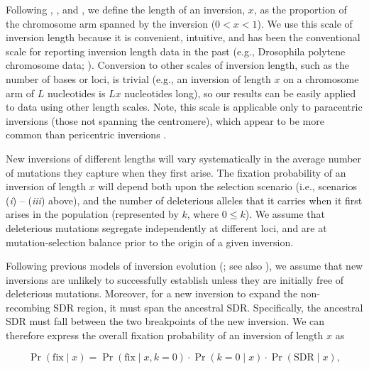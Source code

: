 \documentclass{article}
\begin{document}
Following \citet{vanValenLevins1968}, \citet{Santos1986}, and \citet{ConnallonOlito2020}, we define the length of an inversion, $x$, as the proportion of the chromosome arm spanned by the inversion ($0 < x < 1$). 
We use this scale of inversion length because it is convenient, intuitive, and has been the conventional scale for reporting inversion length data in the past (e.g., Drosophila polytene chromosome data; \citealt{KrimbasPowell1992}). Conversion to other scales of inversion length, such as the number of bases or loci, is trivial (e.g., an inversion of length $x$ on a chromosome arm of $L$ nucleotides is $Lx$ nucleotides long), so our results can be easily applied to data using other length scales. Note, this scale is applicable only to paracentric inversions (those not spanning the centromere), which appear to be more common than pericentric inversions \citep{WellenreutherBernatchez2018}.

New inversions of different lengths will vary systematically in the average number of mutations they capture when they first arise. The fixation probability of an inversion of length $x$ will depend both upon the selection scenario (i.e., scenarios ({\itshape i}) -- ({\itshape iii}) above), and the number of deleterious alleles that it carries when it first arises in the population (represented by $k$, where $0 \leq k$). We assume that deleterious mutations segregate independently at different loci, and are at mutation-selection balance prior to the origin of a given inversion. 

Following previous models of inversion evolution (\citealt{Nei1967, Santos1986, Connallon2018}; see also \citealt{OrrKim1998}), we assume that new inversions are unlikely to successfully establish unless they are initially free of deleterious mutations. Moreover, for a new inversion to expand the non-recombing SDR region, it must span the ancestral SDR. Specifically, the ancestral SDR must fall between the two breakpoints of the new inversion. We can therefore express the overall fixation probability of an inversion of length $x$ as

\begin{equation}\label{eq:generalPrFix}
	\Pr(\text{fix} \mid x) = \Pr(\text{fix} \mid x, k=0) \cdot \Pr(k = 0 \mid x) \cdot \Pr(\text{SDR} \mid x),
\end{equation}
\end{document}
